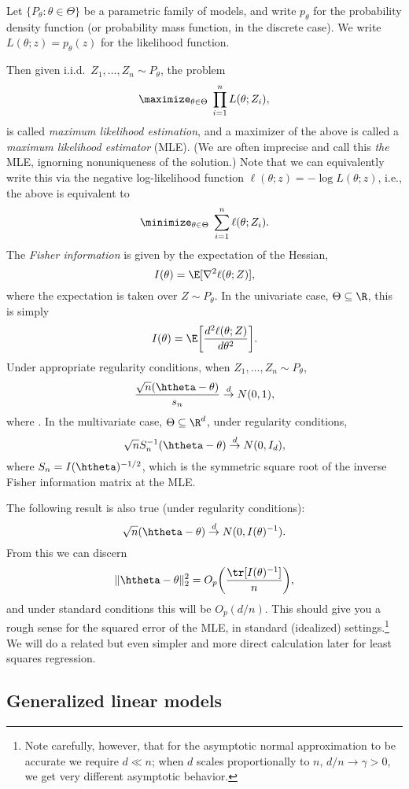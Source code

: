 \documentclass{article}
\begin{document}
Let $\{P_\theta : \theta \in \Theta\}$ be a parametric family of models, and 
write $p_\theta$ for the probability density function (or probability mass
function, in the discrete case). We write $L(\theta; z) = p_\theta(z)$ for the
likelihood function.

Then given i.i.d.\ $Z_1,\dots, Z_n \sim P_\theta$, the problem
\[ 
\maximize_{\theta \in \Theta} \; \prod_{i=1}^n L(\theta; Z_i),
\] 
is called \emph{maximum likelihood estimation}, and a maximizer
\smash{$\htheta$} of the above is called a \emph{maximum likelihood estimator}
(MLE). (We are often imprecise and call this \emph{the} MLE, ignorning
nonuniqueness of the solution.) Note that we can equivalently write this via the 
negative log-likelihood function $\ell(\theta; z) = - \log L(\theta; z)$, i.e., 
the above is equivalent
to  
\[
\minimize_{\theta \in \Theta} \; \sum_{i=1}^n \ell(\theta; Z_i).
\]
The \emph{Fisher information} is given by the expectation of the Hessian,
\[
I(\theta) = \E[\nabla^2 \ell(\theta; Z) ],
\]
where the expectation is taken over $Z \sim P_\theta$. In the univariate case, 
$\Theta \subseteq \R$, this is simply 
\[
I(\theta) = \E\bigg[ \frac{d^2 \ell(\theta; Z)}{d\theta^2} \bigg].
\]
Under appropriate regularity conditions, when $Z_1,\dots,Z_n \sim P_\theta$, 
\[
\frac{\sqrt{n}(\htheta - \theta)}{s_n} \dto N(0, 1),
\]
where . In the multivariate case, $\Theta
\subseteq \R^d$, under regularity conditions,  
\[
\sqrt{n} S_n^{-1} (\htheta - \theta) \dto N(0, I_d),
\]
where $S_n = I(\htheta)^{-1/2}$, which is the symmetric square root of the
inverse Fisher information matrix at the MLE.

The following result is also true (under regularity conditions):
\[
\sqrt{n} (\htheta - \theta) \dto N(0, I(\theta) ^{-1}).
\]
From this we can discern
\[
\|\htheta - \theta\|_2^2 = O_p \bigg( \frac{\tr[I(\theta) ^{-1}]}{n} \bigg),    
\] 
and under standard conditions this will be $O_p(d/n)$. This should give you a
rough sense for the squared error of the MLE, in standard (idealized)
settings.\footnote{ Note carefully, however, that for the asymptotic normal
  approximation to be accurate we require $d \ll n$; when $d$ scales
  proportionally to $n$, $d/n \to \gamma > 0$, we get very different asymptotic
  behavior.} 
We will do a related but even simpler and more direct calculation later for
least squares regression. 

\subsection{Generalized linear models}
\end{document}
